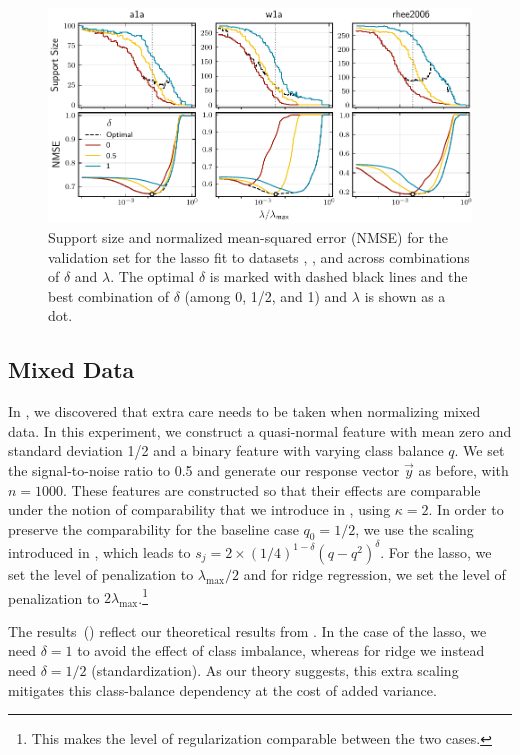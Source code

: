 \begin{figure}[htpb]
  \centering
  \includegraphics[]{plots/hyperopt_paths.pdf}
  \caption{%
    Support size and normalized mean-squared error (NMSE) for the validation set for the lasso fit to datasets , , and  across combinations of \(\delta\) and \(\lambda\). The optimal \(\delta\) is marked with dashed black lines and the best combination of \(\delta\) (among 0, 1/2, and 1) and \(\lambda\) is shown as a dot.
  }
  \label{fig:hyperopt-support}
\end{figure}

\subsection{Mixed Data}\label{sec:experiments-mixed-data}

In , we discovered that extra care needs to be taken when normalizing mixed data. In this experiment, we construct a quasi-normal feature with mean zero and standard deviation 1/2 and a binary feature with varying class balance \(q\). We set the signal-to-noise ratio to 0.5 and generate our response vector \(\vec{y}\) as before, with \(n = \num{1000}\). These features are constructed so that their effects are comparable under the notion of comparability that we introduce in , using \(\kappa = 2\). In order to preserve the comparability for the baseline case \(q_0 = 1/2\), we use the scaling introduced in , which leads to \(s_j = 2 \times (1/4)^{1-\delta}(q-q^2)^\delta\).
For the lasso, we set the level of penalization to \(\lambda_\text{max}/2\) and for ridge regression, we set the level of penalization to \(2\lambda_\text{max}\).\footnote{This makes the level of regularization comparable between the two cases.}

The results~() reflect our theoretical results from . In the case of the lasso, we need \(\delta =1\) to avoid the effect of class imbalance, whereas for ridge we instead need \(\delta =1/2\) (standardization). As our theory suggests, this extra scaling mitigates this class-balance dependency at the cost of added variance.


